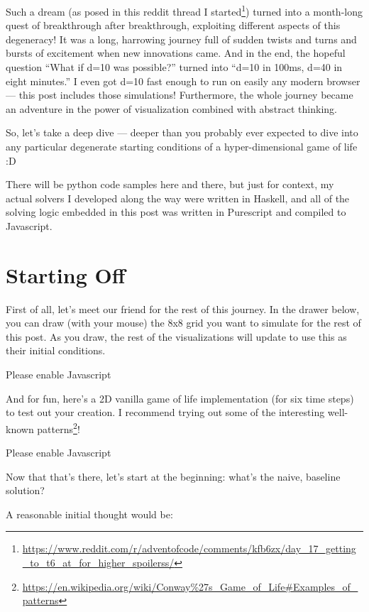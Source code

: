 \documentclass[]{article}
\renewcommand{\href}[2]{#2\footnote{\url{#1}}}
\begin{document}
Such a dream (as posed in
\href{https://www.reddit.com/r/adventofcode/comments/kfb6zx/day_17_getting_to_t6_at_for_higher_spoilerss/}{this
reddit thread I started}) turned into a month-long quest of breakthrough after
breakthrough, exploiting different aspects of this degeneracy! It was a long,
harrowing journey full of sudden twists and turns and bursts of excitement when
new innovations came. And in the end, the hopeful question ``What if d=10 was
possible?'' turned into ``d=10 in 100ms, d=40 in eight minutes.'' I even got
d=10 fast enough to run on easily any modern browser --- this post includes
those simulations! Furthermore, the whole journey became an adventure in the
power of visualization combined with abstract thinking.

So, let's take a deep dive --- deeper than you probably ever expected to dive
into any particular degenerate starting conditions of a hyper-dimensional game
of life :D

There will be python code samples here and there, but just for context, my
actual solvers I developed along the way were written in Haskell, and all of the
solving logic embedded in this post was written in Purescript and compiled to
Javascript.

\hypertarget{starting-off}{%
\section{Starting Off}\label{starting-off}}

First of all, let's meet our friend for the rest of this journey. In the drawer
below, you can draw (with your mouse) the 8x8 grid you want to simulate for the
rest of this post. As you draw, the rest of the visualizations will update to
use this as their initial conditions.

\leavevmode\hypertarget{golDrawer}{}%
Please enable Javascript

And for fun, here's a 2D vanilla game of life implementation (for six time
steps) to test out your creation. I recommend trying out some of the
\href{https://en.wikipedia.org/wiki/Conway\%27s_Game_of_Life\#Examples_of_patterns}{interesting
well-known patterns}!

\leavevmode\hypertarget{gol2D}{}%
Please enable Javascript

Now that that's there, let's start at the beginning: what's the naive, baseline
solution?

A reasonable initial thought would be:
\end{document}
